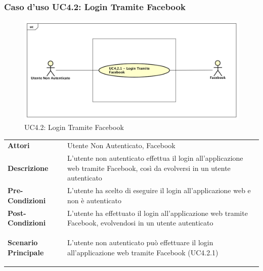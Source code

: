 \subsubsection{Caso d'uso UC4.2:  Login Tramite Facebook }
\label{UC4_2}
\begin{figure}[ht]
	\centering
	\includegraphics[scale=0.45]{UML/UC4_2.png}
	\caption{UC4.2: Login Tramite Facebook}
\end{figure}

\begin{tabular}{ l | p{11cm}}
	\hline
	\rowcolor{Gray}
	 \multicolumn{2}{c}{UC4.2 - Login Tramite Facebook} \\
	 \hline
	\textbf{Attori} & Utente Non Autenticato, Facebook \\
	\textbf{Descrizione} & L'utente non autenticato effettua il login all'applicazione web tramite Facebook, così da evolversi in un utente autenticato\\
	\textbf{Pre-Condizioni} & L'utente ha scelto di eseguire il login all'applicazione web e non è autenticato \\
	\textbf{Post-Condizioni} & L'utente ha effettuato il login all'applicazione web tramite Facebook, evolvendosi in un utente autenticato \\
	\textbf{Scenario Principale} & \begin{enumerate*}[label=(\arabic*.),itemjoin={\newline}]
		\item L'utente non autenticato può effettuare il login all'applicazione web tramite Facebook (UC4.2.1)
	\end{enumerate*}\\
\end{tabular}